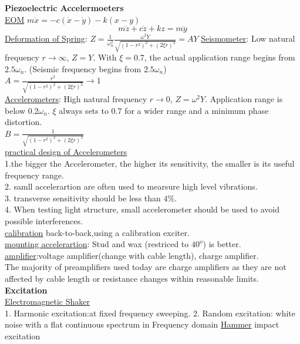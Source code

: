 \documentclass{article}
\begin{document}
\begin{multicols*}{3}
\noindent\textbf{Piezoelectric Accelermoeters}\\
\underline{EOM} $m \ddot{x} = -c(\dot{x}-\dot{y}) - k(x-y)$
\begin{equation*}
  m\ddot{z}+c\dot{z}+kz=m\ddot{y}
\end{equation*}
  \underline{Deformation of Spring}: $Z = \frac{1}{\omega_n^2} \frac{\omega^2Y}{\sqrt{(1-r^2)^2+(2\xi r)^2}} = A Y$
  \underline{Seismometer}: Low natural frequency $r\rightarrow\infty$, $Z = Y$. With $\xi=0.7$, the actual application range begins from $2.5\omega_n$. (Seismic frequency begins from $2.5\omega_n$)\\
  $A=\frac{r^{2}}{\sqrt{(1-r^{2})^{2}+(2\xi r)^{2}}}\rightarrow 1$\\
  \underline{Accelerometers}: High natural frequency $r\rightarrow0$, $Z = \omega^2Y$. Application range is below $0.2\omega_n$. $\xi$ always sets to $0.7$ for a wider range and a minimum phase distortion.\\
  $B=\frac{1}{\sqrt{(1-r^{2})^{2}+(2\xi r)^{2}}}$\\
\underline{practical design of Accelerometers}\\
1.the bigger the Accelerometer, the higher its sensitivity, the smaller is its useful frequency range.\\
2. samll accelerartion are often used to mearsure high level vibrations.\\
3. transverse sensitivity should be less than $4\%$.\\
4. When testing light structure, small accelerometer should be used to avoid possible interferences.\\
\underline{calibration} back-to-back,using a calibration exciter.\\
\underline{mounting accelerartion}: Stud and wax (restriced to $40^{o}$) is better.\\
\underline{amplifier}:voltage amplifier(change with cable length), charge amplifier.\\
The majority of preamplifiers used today are charge amplifiers as they are not affected by cable length or resistance changes within reasonable limits.\\

\noindent\textbf{Excitation}\\
\underline{Electromagnetic Shaker}\\
  1. Harmonic excitation:at fixed frequency sweeping.
  2. Random excitation: white noise with  a flat continuous spectrum in Frequency domain
\underline{Hammer} impact excitation


\end{multicols*}
\end{document}
